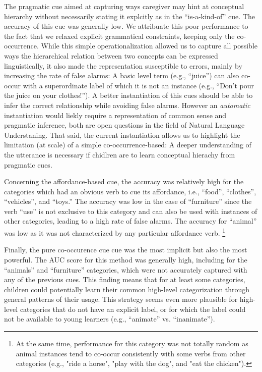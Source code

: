 \documentclass[english,,man,floatsintext]{apa6}
\let\rmarkdownfootnote\footnote%
\def\footnote{\protect\rmarkdownfootnote}
\begin{document}
The pragmatic cue aimed at capturing ways caregiver may hint at conceptual hierarchy without necessarily stating it explcitly as in the \enquote{is-a-kind-of} cue. The accuracy of this cue was generally low. We attribuate this poor performance to the fact that we relaxed explicit grammatical constraints, keeping only the co-occurrence. While this simple operationalization allowed us to capture all possible ways the hierarchical relation between two concepts can be expressed linguistically, it also made the representation susceptible to errors, mainly by increasing the rate of false alarms: A basic level term (e.g., \enquote{juice}) can also co-occur with a superordinate label of which it is not an instance (e.g., \enquote{Don't pour the juice on your clothes!}). A better instantiation of this cues should be able to infer the correct relationship while avoiding false alarms. However an \emph{automatic} instantiation would liekly require a representation of common sense and pragmatic inference, both are open questions in the field of Natural Language Understaning. That said, the current instantiation allows us to highlight the limitation (at scale) of a simple co-occurrence-based: A deeper understanding of the utterance is necessary if chidlren are to learn conceptual hierachy from pragmatic cues.

Concerning the affordance-based cue, the accuracy was relatively high for the categories which had an obvious verb to cue its affordance, i.e., \enquote{food}, \enquote{clothes}, \enquote{vehicles}, and \enquote{toys.} The accuracy was low in the case of \enquote{furniture} since the verb \enquote{use} is not exclusive to this
category and can also be used with instances of other categories, leading to
a high rate of false alarms. The accuracy for
\enquote{animal} was low as it was not characterized by any particular affordance verb. \footnote{At the same time, performance for this category was not totally random as animal instances tend to co-occur consistently with some verbs from other categories (e.g., "ride a horse", "play with the dog", and "eat the chicken").}

Finally, the pure co-occurence cue cue was the most implicit but also the most powerful. The AUC score for this method was generally high, including for the \enquote{animals} and \enquote{furniture}
categories, which were not accurately captured with any of the previous
cues. This finding means that for at least some categories, children could potentially
learn their common high-level categorization through general patterns of their usage. This
strategy seems even more plausible for high-level categories that do not
have an explicit label, or for which the label could not be available to
young learners (e.g., \enquote{animate} vs. \enquote{inanimate}).
\end{document}
